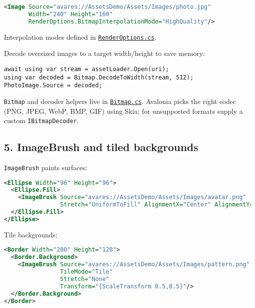 \begin{lstlisting}[language=XML]
<Image Source="avares://AssetsDemo/Assets/Images/photo.jpg"
       Width="240" Height="160"
       RenderOptions.BitmapInterpolationMode="HighQuality"/>
\end{lstlisting}

Interpolation modes defined in
\href{https://github.com/AvaloniaUI/Avalonia/blob/master/src/Avalonia.Base/Media/RenderOptions.cs}{\passthrough{\lstinline!RenderOptions.cs!}}.

Decode oversized images to a target width/height to save memory:

\begin{lstlisting}
await using var stream = assetLoader.Open(uri);
using var decoded = Bitmap.DecodeToWidth(stream, 512);
PhotoImage.Source = decoded;
\end{lstlisting}

\passthrough{\lstinline!Bitmap!} and decoder helpers live in
\href{https://github.com/AvaloniaUI/Avalonia/blob/master/src/Avalonia.Base/Media/Imaging/Bitmap.cs}{\passthrough{\lstinline!Bitmap.cs!}}.
Avalonia picks the right codec (PNG, JPEG, WebP, BMP, GIF) using Skia;
for unsupported formats supply a custom
\passthrough{\lstinline!IBitmapDecoder!}.

\subsection{5. ImageBrush and tiled
backgrounds}\label{imagebrush-and-tiled-backgrounds}

\passthrough{\lstinline!ImageBrush!} paints surfaces:

\begin{lstlisting}[language=XML]
<Ellipse Width="96" Height="96">
  <Ellipse.Fill>
    <ImageBrush Source="avares://AssetsDemo/Assets/Images/avatar.png"
                Stretch="UniformToFill" AlignmentX="Center" AlignmentY="Center"/>
  </Ellipse.Fill>
</Ellipse>
\end{lstlisting}

Tile backgrounds:

\begin{lstlisting}[language=XML]
<Border Width="200" Height="120">
  <Border.Background>
    <ImageBrush Source="avares://AssetsDemo/Assets/Images/pattern.png"
                TileMode="Tile"
                Stretch="None"
                Transform="{ScaleTransform 0.5,0.5}"/>
  </Border.Background>
</Border>
\end{lstlisting}


